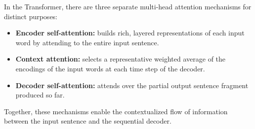 In the Transformer, there are three separate multi-head attention mechanisms for
distinct purposes:
\begin{itemize}
    \item \textbf{Encoder self-attention:} builds rich, layered representations of
          each input word by attending to the entire input sentence.
    \item \textbf{Context attention:} selects
          a representative weighted average of the encodings of the input words at each
          time step of the decoder.
    \item \textbf{Decoder self-attention:} attends over the partial output sentence
          fragment produced so far.
\end{itemize}
Together, these mechanisms enable the contextualized flow of information between
the input sentence and the sequential decoder.

